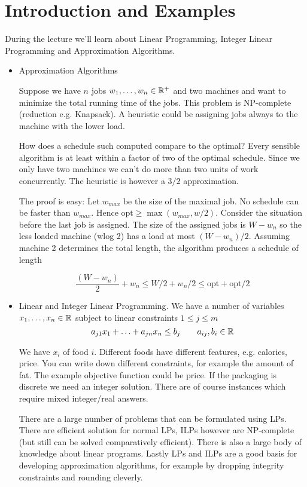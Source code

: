 \chapter{Introduction and Examples}
During the lecture we'll learn about Linear Programming, Integer Linear Programming and Approximation Algorithms.

\begin{itemize}
\item Approximation Algorithms
\begin{Ex} Suppose we have $n$ jobs ${w}_1,\ldots,{w}_{n}\in \mathbb{R}^+$ and two machines and want to minimize the total running time of the jobs. This problem is NP-complete (reduction e.g. Knapsack). A heuristic could be assigning jobs always to the machine with the lower load.

How does a schedule such computed compare to the optimal? Every sensible algorithm is at least within a factor of two of the optimal schedule. Since we only have two machines we can't do more than two units of work concurrently. The heuristic is however a $3/2$ approximation.

The proof is easy: Let $w_{max}$ be the size of the maximal job. No schedule can be faster than $w_{max}$. Hence $\mbox{opt} \geq \max (w_{max}, w/2)$. Consider the situation before the last job is assigned. The size of the assigned jobs is $W-w_n$ so the less loaded machine (wlog 2) has a load at most $(W-w_n)/2$. Assuming machine 2 determines the total length, the algorithm produces a schedule of length 

\[\frac{(W-w_n)}{2} + w_n \leq W/2+w_n/2 \leq \mbox{opt} + \mbox{opt}/2\]
\end{Ex}
\item Linear and Integer Linear Programming. We have a number of variables ${x}_1,\ldots,{x}_{n}\in \mathbb{R}$ subject to linear constraints $1\leq j\leq m$
\[a_{j1}x_1 + \ldots + a_{jn} x_n \leq b_j \qquad a_{ij},b_i \in \mathbb{R}\]

\begin{Ex} We have $x_i$ of food $i$. Different foods have different features, e.g. calories, price. You can write down different constraints, for example the amount of fat. The example objective function could be price. If the packaging is discrete we need an integer solution. There are of course instances which require mixed integer/real answers.
\end{Ex}

There are a large number of problems that can be formulated using LPs. There are efficient solution for normal LPs, ILPs however are NP-complete (but still can be solved comparatively efficient). There is also a large body of knowledge about linear programs. Lastly LPs and ILPs are a good basis for developing approximation algorithms, for example by dropping integrity constraints and rounding cleverly.


\end{itemize}
